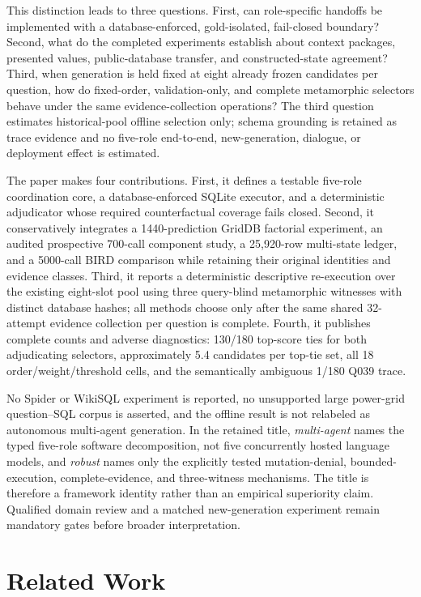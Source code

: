 \documentclass[applsci,article,submit,moreauthors]{Definitions/mdpi}
\begin{document}
This distinction leads to three questions. First, can role-specific handoffs be implemented with a database-enforced, gold-isolated, fail-closed boundary? Second, what do the completed experiments establish about context packages, presented values, public-database transfer, and constructed-state agreement? Third, when generation is held fixed at eight already frozen candidates per question, how do fixed-order, validation-only, and complete metamorphic selectors behave under the same evidence-collection operations? The third question estimates historical-pool offline selection only; schema grounding is retained as trace evidence and no five-role end-to-end, new-generation, dialogue, or deployment effect is estimated.

The paper makes four contributions. First, it defines a testable five-role coordination core, a database-enforced SQLite executor, and a deterministic adjudicator whose required counterfactual coverage fails closed. Second, it conservatively integrates a 1440-prediction GridDB factorial experiment, an audited prospective 700-call component study, a 25,920-row multi-state ledger, and a 5000-call BIRD comparison while retaining their original identities and evidence classes. Third, it reports a deterministic descriptive re-execution over the existing eight-slot pool using three query-blind metamorphic witnesses with distinct database hashes; all methods choose only after the same shared 32-attempt evidence collection per question is complete. Fourth, it publishes complete counts and adverse diagnostics: 130/180 top-score ties for both adjudicating selectors, approximately 5.4 candidates per top-tie set, all 18 order/weight/threshold cells, and the semantically ambiguous 1/180 Q039 trace.

No Spider or WikiSQL experiment is reported, no unsupported large power-grid question--SQL corpus is asserted, and the offline result is not relabeled as autonomous multi-agent generation. In the retained title, \emph{multi-agent} names the typed five-role software decomposition, not five concurrently hosted language models, and \emph{robust} names only the explicitly tested mutation-denial, bounded-execution, complete-evidence, and three-witness mechanisms. The title is therefore a framework identity rather than an empirical superiority claim. Qualified domain review and a matched new-generation experiment remain mandatory gates before broader interpretation.

\section{Related Work}
\end{document}
